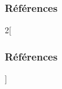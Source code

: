 \documentclass[xcolor=table]{beamer}
\begin{document}
\begin{frame}
\frametitle{Références}

\tiny

%	
%	
	

\end{frame}

\nocite{*}
%
% 

\begin{multicols*}{2}[\frametitle{Références}]%
	\tiny
	
	
\end{multicols*}
\end{document}
